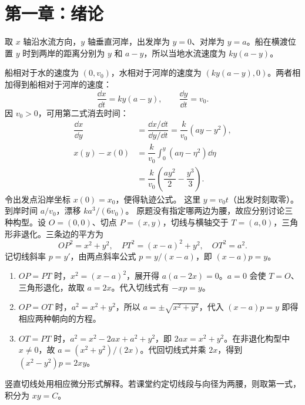 \section{第一章：绪论}
取 $x$ 轴沿水流方向，$y$ 轴垂直河岸，出发岸为 $y=0$、对岸为 $y=a$。船在横渡位置 $y$ 时到两岸的距离分别为 $y$ 和 $a-y$，所以当地水流速度为 $ky(a-y)$。

船相对于水的速度为 $(0,v_0)$，水相对于河岸的速度为 $(ky(a-y),0)$。两者相加得到船相对于河岸的速度：
\[
\dfrac{\dd x}{\dd t}=ky(a-y),\qquad \dfrac{\dd y}{\dd t}=v_0.
\]
因 $v_0>0$，可用第二式消去时间：
\[
\begin{aligned}
\dfrac{\dd x}{\dd y}&=\dfrac{\dd x/\dd t}{\dd y/\dd t}
=\dfrac{k}{v_0}(ay-y^2),\\
x(y)-x(0)&=\dfrac{k}{v_0}\int_0^y(a\eta-\eta^2)\dd\eta\\
&=\dfrac{k}{v_0}\left(\dfrac{ay^2}{2}-\dfrac{y^3}{3}\right).
\end{aligned}
\]
令出发点沿岸坐标 $x(0)=x_0$，便得轨迹公式。
这里 $y=v_0t$（出发时刻取零）。到岸时间 $a/v_0$，漂移 $ka^3/(6v_0)$。
原题没有指定哪两边为腰，故应分别讨论三种构型。设 $O=(0,0)$、切点 $P=(x,y)$，切线与横轴交于 $T=(a,0)$，三角形非退化。三条边的平方为
\[
OP^2=x^2+y^2,\quad PT^2=(x-a)^2+y^2,\quad OT^2=a^2.
\]
记切线斜率 $p=y'$，由两点斜率公式 $p=y/(x-a)$，即 $(x-a)p=y$。
\begin{enumerate}
\item $OP=PT$ 时，$x^2=(x-a)^2$，展开得 $a(a-2x)=0$。$a=0$ 会使 $T=O$、三角形退化，故取 $a=2x$。代入切线式有 $-xp=y$。
\item $OP=OT$ 时，$a^2=x^2+y^2$，所以 $a=\pm\sqrt{x^2+y^2}$，代入 $(x-a)p=y$ 即得相应两种朝向的方程。
\item $OT=PT$ 时，$a^2=x^2-2ax+a^2+y^2$，即 $2ax=x^2+y^2$。在非退化构型中 $x\ne0$，故 $a=(x^2+y^2)/(2x)$。代回切线式并乘 $2x$，得到 $(x^2-y^2)p=2xy$。
\end{enumerate}
竖直切线处用相应微分形式解释。若课堂约定切线段与向径为两腰，则取第一式，积分为 $xy=C$。

